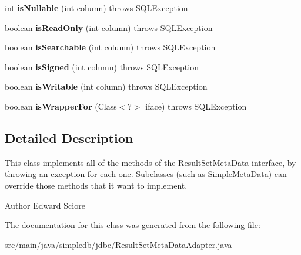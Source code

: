 \begin{DoxyCompactItemize}
\mbox{\label{classsimpledb_1_1jdbc_1_1ResultSetMetaDataAdapter_aa705c4441a09aa3a4362998cc9f459aa}} 
int {\bfseries is\+Nullable} (int column)  throws S\+Q\+L\+Exception 
\item 
\mbox{\label{classsimpledb_1_1jdbc_1_1ResultSetMetaDataAdapter_a5ff747f59d5b09a70dd0006e367ce7e0}} 
boolean {\bfseries is\+Read\+Only} (int column)  throws S\+Q\+L\+Exception 
\item 
\mbox{\label{classsimpledb_1_1jdbc_1_1ResultSetMetaDataAdapter_aa91327f8eade9256dad719047bfa2c09}} 
boolean {\bfseries is\+Searchable} (int column)  throws S\+Q\+L\+Exception 
\item 
\mbox{\label{classsimpledb_1_1jdbc_1_1ResultSetMetaDataAdapter_a6f7ea83b6fd72384701f70f24de08d61}} 
boolean {\bfseries is\+Signed} (int column)  throws S\+Q\+L\+Exception 
\item 
\mbox{\label{classsimpledb_1_1jdbc_1_1ResultSetMetaDataAdapter_a435de4897d986005a4edcc72abde4238}} 
boolean {\bfseries is\+Writable} (int column)  throws S\+Q\+L\+Exception 
\item 
\mbox{\label{classsimpledb_1_1jdbc_1_1ResultSetMetaDataAdapter_ad0387d24dc7713b06f3557f1186412b3}} 
boolean {\bfseries is\+Wrapper\+For} (Class$<$?$>$ iface)  throws S\+Q\+L\+Exception 
\end{DoxyCompactItemize}


\subsection{Detailed Description}
This class implements all of the methods of the Result\+Set\+Meta\+Data interface, by throwing an exception for each one. Subclasses (such as Simple\+Meta\+Data) can override those methods that it want to implement. \begin{DoxyAuthor}{Author}
Edward Sciore 
\end{DoxyAuthor}


The documentation for this class was generated from the following file\+:\begin{DoxyCompactItemize}
\item 
src/main/java/simpledb/jdbc/Result\+Set\+Meta\+Data\+Adapter.\+java\end{DoxyCompactItemize}
